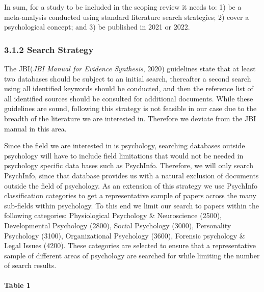 \documentclass[
  letterpaper,
  DIV=11,
  numbers=noendperiod]{scrartcl}
\let\oldparagraph\paragraph
\renewcommand{\paragraph}[1]{\oldparagraph{#1}\mbox{}}
\begin{document}
In sum, for a study to be included in the scoping review it needs to: 1)
be a meta-analysis conducted using standard literature search
strategies; 2) cover a psychological concept; and 3) be published in
2021 or 2022.

\hypertarget{search-strategy}{%
\subsubsection{3.1.2 Search Strategy}\label{search-strategy}}

The JBI(\emph{{JBI} {Manual} for {Evidence} {Synthesis}}, 2020)
guidelines state that at least two databases should be subject to an
initial search, thereafter a second search using all identified keywords
should be conducted, and then the reference list of all identified
sources should be consulted for additional documents. While these
guidelines are sound, following this strategy is not feasible in our
case due to the breadth of the literature we are interested in.
Therefore we deviate from the JBI manual in this area.

Since the field we are interested in is psychology, searching databases
outside psychology will have to include field limitations that would not
be needed in psychology specific data bases such as PsychInfo.
Therefore, we will only search PsychInfo, since that database provides
us with a natural exclusion of documents outside the field of
psychology. As an extension of this strategy we use PsychInfo
classification categories to get a representative sample of papers
across the many sub-fields within psychology. To this end we limit our
search to papers within the following categories: Physiological
Psychology \& Neuroscience (2500), Developmental Psychology (2800),
Social Psychology (3000), Personality Psychology (3100), Organizational
Psychology (3600), Forensic psychology \& Legal Issues (4200). These
categories are selected to ensure that a representative sample of
different areas of psychology are searched for while limiting the number
of search results.

\hypertarget{table-1}{%
\paragraph{Table 1}\label{table-1}}
\end{document}
